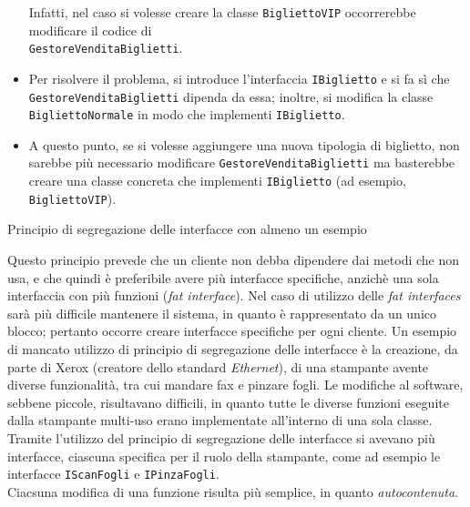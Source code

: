 \begin{solution}
\begin{itemize}
	\newline Infatti, nel caso si volesse creare la classe \texttt{BigliettoVIP} occorrerebbe modificare il codice di \\\texttt{GestoreVenditaBiglietti}.
	\item Per risolvere il problema, si introduce l'interfaccia \texttt{IBiglietto} e si fa sì che \texttt{GestoreVenditaBiglietti} dipenda da essa; inoltre, si modifica la classe \texttt{BigliettoNormale} in modo che implementi \texttt{IBiglietto}.
	\item A questo punto, se si volesse aggiungere una nuova tipologia di biglietto, non sarebbe più necessario modificare \texttt{GestoreVenditaBiglietti} ma basterebbe creare una classe concreta che implementi \texttt{IBiglietto} (ad esempio, \texttt{BigliettoVIP}).
\end{itemize}
\end{solution}


\begin{problem}{1.13}
Principio di segregazione delle interfacce con almeno un esempio
\end{problem}
\begin{solution}
Questo principio prevede che un cliente non debba dipendere dai metodi che non usa, e che quindi è preferibile avere più interfacce specifiche, anzichè una sola interfaccia con più funzioni (\textit{fat interface}).
\newline
Nel caso di utilizzo delle \textit{fat interfaces} sarà più difficile mantenere il sistema, in quanto è rappresentato da un unico blocco; pertanto occorre creare interfacce specifiche per ogni cliente.
\newline
Un esempio di mancato utilizzo di principio di segregazione delle interfacce è la creazione, da parte di Xerox (creatore dello standard \textit{Ethernet}), di una stampante avente diverse funzionalità, tra cui mandare fax e pinzare fogli. Le modifiche al software, sebbene piccole, risultavano difficili, in quanto tutte le diverse funzioni eseguite dalla stampante multi-uso erano implementate all'interno di una sola classe.
Tramite l'utilizzo del principio di segregazione delle interfacce si avevano più interfacce, ciascuna specifica per il ruolo della stampante, come ad esempio le interfacce \texttt{IScanFogli} e \texttt{IPinzaFogli}.
\\
Ciacsuna modifica di una funzione risulta più semplice, in quanto \textit{autocontenuta}.
\end{solution}


